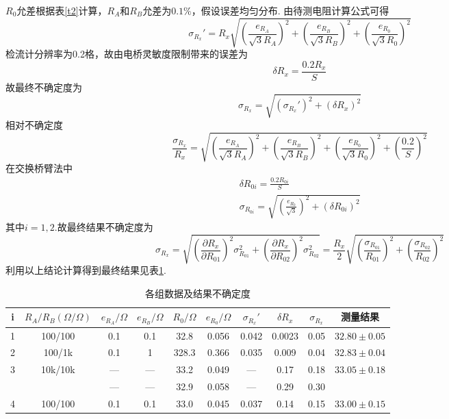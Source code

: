 \documentclass[12pt, a4paper]{ctexart}
\begin{document}
$R_0$允差根据表\ref{t2}计算，$R_A$和$R_B$允差为$0.1\%$，假设误差均匀分布.
由待测电阻计算公式可得
\begin{equation*}
    \sigma_{R_x}' = R_x \sqrt{(\frac{e_{R_A}}{\sqrt{3}R_A})^2 + (\frac{e_{R_B}}{\sqrt{3}R_B})^2 + (\frac{e_{R_0}}{\sqrt{3}R_0})^2}
\end{equation*}
检流计分辨率为0.2格，故由电桥灵敏度限制带来的误差为
\begin{equation*}
    \delta R_x = \frac{0.2R_x}{S}
\end{equation*}
故最终不确定度为
\begin{equation*}
    \sigma_{R_x} = \sqrt{(\sigma_{R_x}')^2 + (\delta R_x)^2}
\end{equation*}
相对不确定度
\begin{equation*}
    \frac{\sigma_{R_x}}{R_x} = \sqrt{(\frac{e_{R_A}}{\sqrt{3}R_A})^2 + (\frac{e_{R_B}}{\sqrt{3}R_B})^2 + (\frac{e_{R_0}}{\sqrt{3}R_0})^2 + (\frac{0.2}{S})^2}
\end{equation*}
在交换桥臂法中
\begin{gather*}
    \delta R_{0i} = \frac{0.2R_{0i}}{S}\\
    \sigma_{R_{0i}} = \sqrt{(\frac{e_{R_0}}{\sqrt{3}})^2 + (\delta R_{0i})^2}
\end{gather*}
其中$i = 1,2$.故最终结果不确定度为
\begin{equation*}
    \sigma_{R_x} = \sqrt{(\frac{\partial R_x}{\partial R_{01}})^2 \sigma_{R_{01}}^2 + (\frac{\partial R_x}{\partial R_{02}})^2 \sigma_{R_{02}}^2} = \frac{R_x}{2}\sqrt{(\frac{\sigma_{R_{01}}}{R_{01}})^2 + (\frac{\sigma_{R_{02}}}{R_{02}})^2}
\end{equation*}
利用以上结论计算得到最终结果见表\ref{t4}.
\begin{table}[htbp]
    \centering
    \begin{tabular}{cccccccccc}
        \toprule
        i & $R_A/R_B(\Omega/\Omega)$ & $e_{R_A}/\Omega$ & $e_{R_B}/\Omega$ & $R_0/\Omega$ & $e_{R_0}/\Omega$ & $\sigma_{R_x}'$ & $\delta R_x$ & $\sigma_{R_x}$ & 测量结果 \\
        \midrule
        1 & 100/100 & 0.1 & 0.1 & 32.8 & 0.056 & 0.042 & 0.0023 & 0.05 & $32.80 \pm 0.05$ \\
        \hline
        2 & 100/1k & 0.1 & 1 & 328.3 & 0.366 & 0.035 & 0.009 & 0.04 & $32.83 \pm 0.04$ \\
        \hline
        \multirow{2}{*}{3} & \multirow{2}{*}{10k/10k} & — & — & 33.2 & 0.049 & — & 0.17 & 0.18 & \multirow{2}{*}{$33.05 \pm 0.18$} \\
        \cline{3-9}
          &  & — & — & 32.9 & 0.058 & — & 0.29 & 0.30 &  \\
        \hline
        4 & 100/100 & 0.1 & 0.1 & 33.0 & 0.045 & 0.037 & 0.14 & 0.15 & $33.00 \pm 0.15$ \\
        \bottomrule
    \end{tabular}
    \caption{各组数据及结果不确定度}
    \label{t4}
\end{table}
\end{document}
